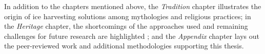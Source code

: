 In addition to the chapters mentioned above, the \textit{Tradition} chapter illustrates the origin of ice
harvesting solutions among mythologies and religious practices; in the \textit{Heritage} chapter, the
shortcomings of the approaches used and remaining challenges for future research are highlighted ; and the
\textit{Appendix} chapter lays out the peer-reviewed work and additional methodologies supporting this thesis.


